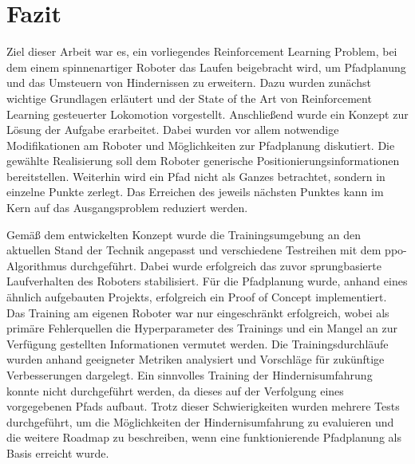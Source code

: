 \chapter{Fazit}
Ziel dieser Arbeit war es, ein vorliegendes Reinforcement Learning Problem, bei dem einem spinnenartiger Roboter das Laufen beigebracht wird, um Pfadplanung und das Umsteuern von Hindernissen zu erweitern.
Dazu wurden zunächst wichtige Grundlagen erläutert und der State of the Art von Reinforcement Learning gesteuerter Lokomotion vorgestellt.
Anschließend wurde ein Konzept zur Lösung der Aufgabe erarbeitet.
Dabei wurden vor allem notwendige Modifikationen am Roboter und Möglichkeiten zur Pfadplanung diskutiert.
Die gewählte Realisierung soll dem Roboter generische Positionierungsinformationen bereitstellen.
Weiterhin wird ein Pfad nicht als Ganzes betrachtet, sondern in einzelne Punkte zerlegt.
Das Erreichen des jeweils nächsten Punktes kann im Kern auf das Ausgangsproblem reduziert werden.

Gemäß dem entwickelten Konzept wurde die Trainingsumgebung an den aktuellen Stand der Technik angepasst und verschiedene Testreihen mit dem \acl{ppo}-Algorithmus durchgeführt.
Dabei wurde erfolgreich das zuvor sprungbasierte Laufverhalten des Roboters stabilisiert.
Für die Pfadplanung wurde, anhand eines ähnlich aufgebauten Projekts, erfolgreich ein Proof of Concept implementiert.
Das Training am eigenen Roboter war nur eingeschränkt erfolgreich, wobei als primäre Fehlerquellen die Hyperparameter des Trainings und ein Mangel an zur Verfügung gestellten Informationen vermutet werden.
Die Trainingsdurchläufe wurden anhand geeigneter Metriken analysiert und Vorschläge für zukünftige Verbesserungen dargelegt.
Ein sinnvolles Training der Hindernisumfahrung konnte nicht durchgeführt werden, da dieses auf der Verfolgung eines vorgegebenen Pfads aufbaut.
Trotz dieser Schwierigkeiten wurden mehrere Tests durchgeführt, um die Möglichkeiten der Hindernisumfahrung zu evaluieren und die weitere Roadmap zu beschreiben, wenn eine funktionierende Pfadplanung als Basis erreicht wurde.